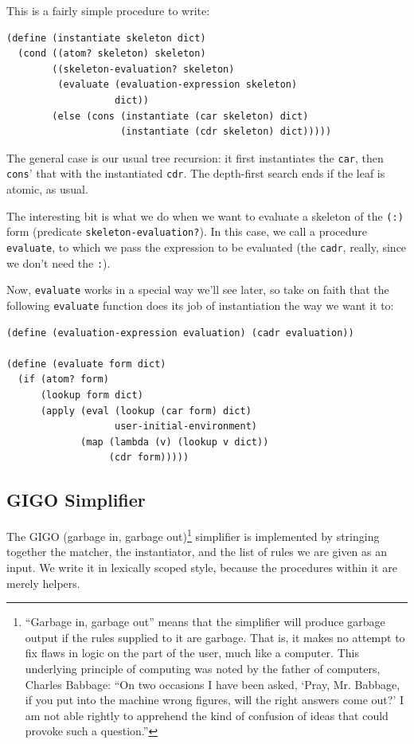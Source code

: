 \documentclass[9pt]{report}
\begin{document}
This is a fairly simple procedure to write:

\begin{verbatim}
(define (instantiate skeleton dict)
  (cond ((atom? skeleton) skeleton)
        ((skeleton-evaluation? skeleton)
         (evaluate (evaluation-expression skeleton)
                   dict))
        (else (cons (instantiate (car skeleton) dict)
                    (instantiate (cdr skeleton) dict)))))
\end{verbatim}

The general case is our usual tree recursion: it first
instantiates the \texttt{car}, then \texttt{cons}' that with the instantiated
\texttt{cdr}. The depth-first search ends if the leaf is atomic, as
usual.

The interesting bit is what we do when we want to evaluate a
skeleton of the \texttt{(:)} form (predicate \texttt{skeleton-evaluation?}). In
this case, we call a procedure \texttt{evaluate}, to which we pass the
expression to be evaluated (the \texttt{cadr}, really, since we don't
need the \texttt{:}).

Now, \texttt{evaluate} works in a special way we'll see later, so take on
faith that the following \texttt{evaluate} function does its job of
instantiation the way we want it to:

\begin{verbatim}
(define (evaluation-expression evaluation) (cadr evaluation))

(define (evaluate form dict)
  (if (atom? form)
      (lookup form dict)
      (apply (eval (lookup (car form) dict)
                   user-initial-environment)
             (map (lambda (v) (lookup v dict))
                  (cdr form)))))
\end{verbatim}

\subsection{GIGO Simplifier}
\label{sec:org67ba388}

The GIGO (garbage in, garbage out)\footnote{``Garbage in, garbage out'' means that the simplifier will
produce garbage output if the rules supplied to it are garbage. That
is, it makes no attempt to fix flaws in logic on the part of the user,
much like a computer. This underlying principle of computing was noted
by the father of computers, Charles Babbage: ``On two occasions I have
been asked, `Pray, Mr. Babbage, if you put into the machine wrong
figures, will the right answers come out?' I am not able rightly
to apprehend the kind of confusion of ideas that could provoke such a
question.''} simplifier is implemented
by stringing together the matcher, the instantiator, and the list
of rules we are given as an input. We write it in lexically scoped
style, because the procedures within it are merely helpers.
\end{document}
